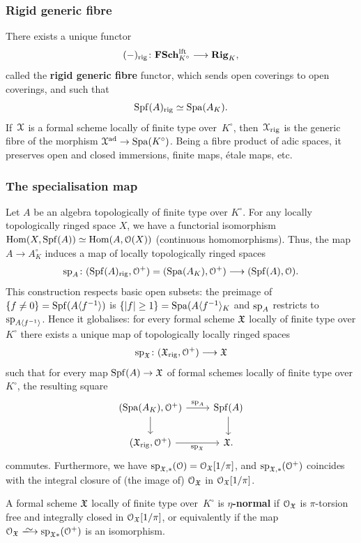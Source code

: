 \subsubsection*{Rigid generic fibre}

There exists a unique functor 
\[
    (-)_{\rm rig} \colon \mathbf{FSch}^{\rm lft}_{K^\circ} \longrightarrow \mathbf{Rig}_K,
\]
called the {\bf rigid generic fibre} functor, which sends open coverings to open coverings, and such that 
\[ 
    \operatorname{Spf}(A)_{\rm rig} \simeq \operatorname{Spa}(A_K).
\]
If~${\mathcal X}$ is a formal scheme locally of finite type over~$K^\circ$, then~${\mathcal X}_{\rm rig}$ is the generic fibre of the morphism ${\mathcal X}^{\rm ad} \to \operatorname{Spa} (K^\circ)$.
Being a fibre product of adic spaces, it preserves open and closed immersions, finite maps, étale maps, etc.

\subsubsection*{The specialisation map}

Let $A$ be an algebra topologically of finite type over $K^\circ$. For any locally topologically ringed space $X$, we have a functorial isomorphism $\operatorname{Hom}(X, \operatorname{Spf}(A))\simeq \operatorname{Hom}(A, {\mathcal O}(X))$ (continuous homomorphisms). Thus, the map $A\to A_K^\circ$ induces a map of locally topologically ringed spaces
\[ 
    {\rm sp}_A \colon (\operatorname{Spf}(A)_{\rm rig}, {\mathcal O}^+) = (\operatorname{Spa}(A_K),  {\mathcal O}^+) \longrightarrow (\operatorname{Spf}(A), {\mathcal O}). 
\]
This construction respects basic open subsets: the preimage of $\{f\neq 0\}=\operatorname{Spf}(A\langle f^{-1}\rangle)$ is $\{|f|\geq  1\} = \operatorname{Spa}(A\langle f^{-1}\rangle_K$ and ${\rm sp}_A$ restricts to ${\rm sp}_{A\langle f^{-1}\rangle}$.  Hence it globalises: for every formal scheme ${\mathfrak{X}}$ locally of finite type over $K^\circ$ there exists a unique map of topologically locally ringed spaces
\[
    {\rm sp}_{{\mathfrak{X}}} \colon ({\mathfrak{X}}_{\rm rig}, {\mathcal O}^+)\longrightarrow {\mathfrak{X}}
\]
such that for every map $\operatorname{Spf}(A)\to {\mathfrak{X}}$ of formal schemes locally of finite type over $K^\circ$, the resulting square 
\[ 
    \begin{tikzcd}
        (\Spa(A_K), \cO^+) \ar[d] \ar[r,"{\rm sp}_A"] & \Spf(A) \ar[d] \\
        (\fX_{\rm rig}, \cO^+) \ar[r,"{\rm sp}_\fX",swap] & \fX.
    \end{tikzcd}
\]
commutes.
Furthermore, we have ${\rm sp}_{{\mathfrak{X}},*}({\mathcal O}) = {\mathcal O}_{\mathfrak{X}}[1/\pi]$, and ${\rm sp}_{{\mathfrak{X}},*}({\mathcal O}^+)$ coincides with the integral closure of (the image of) ${\mathcal O}_{{\mathfrak{X}}}$ in ${\mathcal O}_{{\mathfrak{X}}}[1/\pi]$.

\begin{defi} \label{defi:eta-normal}
    A formal scheme ${\mathfrak{X}}$ locally of finite type over~$K^\circ$ is 
    {\bf \mbox{$\eta$-normal}} if ${\mathcal O}_{{\mathfrak{X}}}$ is $\pi$-torsion free and integrally closed in ${\mathcal O}_{{\mathfrak{X}}}[1/\pi]$, or equivalently if the map $\cO_\fX \isomto {\rm sp}_{\fX*}(\cO^+)$ is an isomorphism.
\end{defi}

